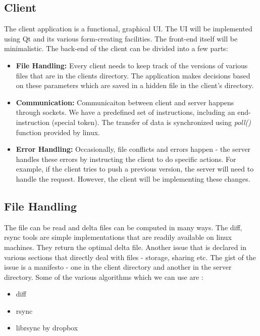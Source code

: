 \documentclass[]{article}
\begin{document}
\subsection{Client}
The client application is a functional, graphical UI. The UI will be implemented using Qt and its various form-creating facilities. The front-end itself will be minimalistic.
The back-end of the client can be divided into a few parts:
\begin{itemize}
\item \textbf{File Handling:}
Every client needs to keep track of the versions of various files that are in the clients directory. The application makes decisions based on these parameters which are saved in a hidden file in the client's directory.
\item \textbf{Communication:}
Communicaiton between client and server happens through sockets. We have a predefined set of instructions, including an end-instruction (special token). The transfer of data is synchronized using \textit{poll()} function provided by linux.
\item \textbf{Error Handling:}
Occasionally, file conflicts and errors happen - the server handles these errors by instructing the client to do specific actions. For example, if the client tries to push a previous version, the server will need to handle the request. However, the client will be implementing these changes.
\end{itemize}

\subsection{File Handling}
The file can be read and delta files can be computed in many ways. The diff, rsync tools are simple implementations that are readily available on linux machines. They return the optimal delta file.
Another issue that is declared in various sections that directly deal with files - storage, sharing etc.
The gist of the issue is a manifesto - one in the client directory and another in the server directory.
Some of the various algorithms which we can use are :
\begin{itemize}
\item diff
\item rsync
\item librsync by dropbox
\end{itemize}
\end{document}
